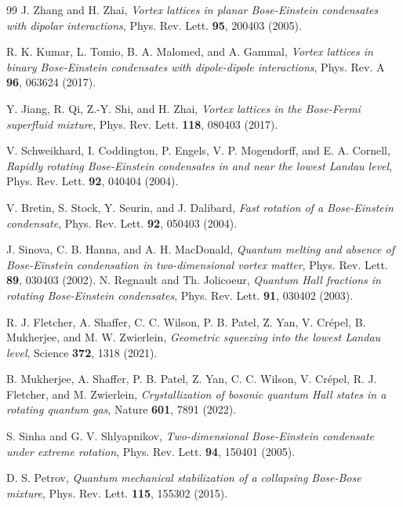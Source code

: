 \documentclass[reprint,aps,pra,twocolumn,superscriptaddress]{revtex4-1}
\begin{document}
\begin{thebibliography}{99}
 J. Zhang and H. Zhai, \textit{Vortex lattices in planar Bose-Einstein condensates with dipolar interactions}, {Phys. Rev. Lett. {\bf 95}, 200403 (2005)}.

 R. K. Kumar, L. Tomio, B. A. Malomed, and A. Gammal, \textit{Vortex lattices in binary Bose-Einstein condensates with dipole-dipole interactions}, {Phys. Rev. A {\bf 96}, 063624 (2017)}.

 Y. Jiang, R. Qi, Z.-Y. Shi, and H. Zhai, \textit{Vortex lattices in the Bose-Fermi superfluid mixture}, {Phys. Rev. Lett. {\bf 118}, 080403 (2017)}.


  V. Schweikhard, I. Coddington, P. Engels, V. P. Mogendorff, and E. A. Cornell, \textit{Rapidly rotating Bose-Einstein condensates in and near the lowest Landau level}, {Phys. Rev. Lett. {\bf 92}, 040404 (2004)}.

 V. Bretin, S. Stock, Y. Seurin, and J. Dalibard, \textit{Fast rotation of a Bose-Einstein condensate},  {Phys. Rev. Lett. {\bf 92}, 050403 (2004)}.

     J. Sinova, C. B. Hanna, and A. H. MacDonald, \textit{Quantum melting and absence of Bose-Einstein condensation in two-dimensional vortex matter}, %
    {Phys. Rev. Lett. {\bf 89}, 030403 (2002)}.
     N. Regnault and Th. Jolicoeur, \textit{Quantum Hall fractions in rotating Bose-Einstein condensates}, %
    {Phys. Rev. Lett. {\bf 91}, 030402 (2003)}.
    


 
  R. J. Fletcher, A. Shaffer, C. C. Wilson, P. B. Patel, Z. Yan, V. Crépel, B. Mukherjee, and M. W. Zwierlein, \textit{Geometric squeezing into the lowest Landau level},  {Science {\bf 372}, 1318 (2021)}.

 
  B. Mukherjee, A. Shaffer, P. B. Patel, Z. Yan, C. C. Wilson, V. Crépel, R. J. Fletcher, and M. Zwierlein, \textit{Crystallization of bosonic quantum Hall states in a rotating quantum gas},  {Nature {\bf 601}, 7891 (2022)}.

 
  S. Sinha and G. V. Shlyapnikov, \textit{Two-dimensional Bose-Einstein condensate under extreme rotation}, {Phys. Rev. Lett. {\bf 94}, 150401 (2005)}.


 D. S. Petrov, \textit{Quantum mechanical stabilization of a collapsing Bose-Bose mixture},  {Phys. Rev. Lett. {\bf 115}, 155302 (2015)}.



\end{thebibliography}
\end{document}
